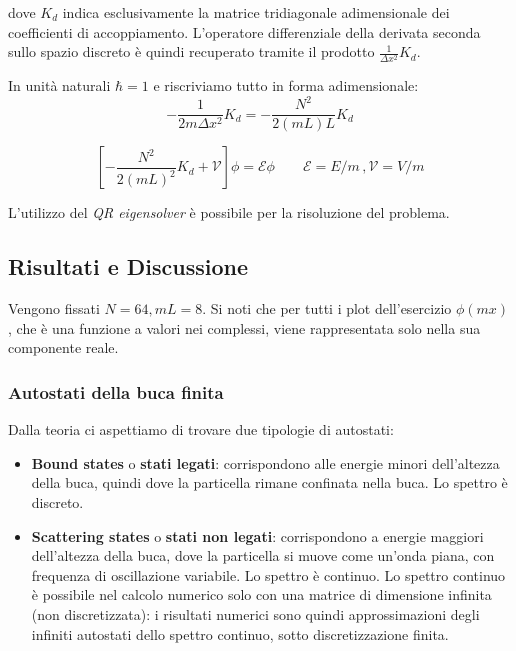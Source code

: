 \noindent dove $K_d$ indica esclusivamente la matrice tridiagonale adimensionale dei coefficienti di accoppiamento. L'operatore differenziale della derivata seconda sullo spazio discreto è quindi recuperato tramite il prodotto $\frac{1}{\Delta x^2}K_d$.

\medskip\noindent
In unità naturali $\hbar = 1$ e riscriviamo tutto in forma adimensionale:
\begin{equation*}
    - \frac{1}{2m \Delta x^2} K_d = - \frac{N^2 }{2 (mL) L} K_d 
\end{equation*}


\begin{equation*}
    \left[ - \frac{N^2}{2 (mL)^2} K_d + \mathcal V \right] \phi = \mathcal E \phi \qquad \mathcal E = E/m \,, \mathcal V = V/m
\end{equation*}

\medskip\noindent
L'utilizzo del \textit{QR eigensolver} è possibile per la risoluzione del problema.


\subsection{Risultati e Discussione}
Vengono fissati $N=64, mL=8$. Si noti che per tutti i plot dell'esercizio $\phi(mx)$, che è una funzione a valori nei complessi, viene rappresentata solo nella sua componente reale.

\subsubsection{Autostati della buca finita}
Dalla teoria ci aspettiamo di trovare due tipologie di autostati:
\begin{itemize}
    \item \textbf{Bound states} o \textbf{stati legati}: corrispondono alle energie minori dell'altezza della buca, quindi dove la particella rimane confinata nella buca. Lo spettro è discreto.
    \item \textbf{Scattering states} o \textbf{stati non legati}: corrispondono a energie maggiori dell'altezza della buca, dove la particella si muove come un'onda piana, con frequenza di oscillazione variabile. Lo spettro è continuo. Lo spettro continuo è possibile nel calcolo numerico solo con una matrice di dimensione infinita (non discretizzata): i risultati numerici sono quindi approssimazioni degli infiniti autostati dello spettro continuo, sotto discretizzazione finita.
\end{itemize}

